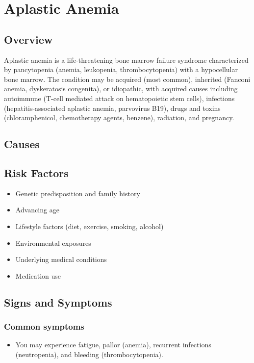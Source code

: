 \chapter{Aplastic Anemia}
\label{sec:Aplastic Anemia}

\section{Overview}
Aplastic anemia is a life-threatening bone marrow failure syndrome characterized by pancytopenia (anemia, leukopenia, thrombocytopenia) with a hypocellular bone marrow. The condition may be acquired (most common), inherited (Fanconi anemia, dyskeratosis congenita), or idiopathic, with acquired causes including autoimmune (T-cell mediated attack on hematopoietic stem cells), infections (hepatitis-associated aplastic anemia, parvovirus B19), drugs and toxins (chloramphenicol, chemotherapy agents, benzene), radiation, and pregnancy.
\section{Causes}
\section{Risk Factors}

\begin{itemize}[noitemsep]
  \item Genetic predisposition and family history
  \item Advancing age
  \item Lifestyle factors (diet, exercise, smoking, alcohol)
  \item Environmental exposures
  \item Underlying medical conditions
  \item Medication use
\end{itemize}
\section{Signs and Symptoms}

\subsection{Common symptoms}
\begin{itemize}[noitemsep]
  \item You may experience fatigue, pallor (anemia), recurrent infections (neutropenia), and bleeding (thrombocytopenia). 
  \end{itemize}

